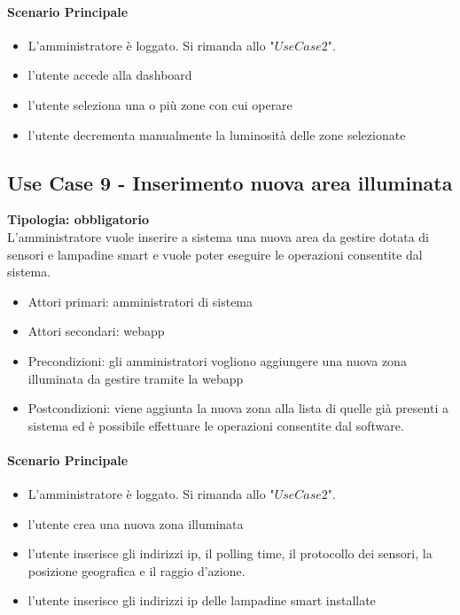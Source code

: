 \documentclass[12pt]{article}
\begin{document}
\paragraph{Scenario Principale}
\begin{itemize}
	\item L'amministratore è loggato. Si rimanda allo "$Use Case 2$".
	\item l'utente accede alla dashboard
	\item l'utente seleziona una o più zone con cui operare
	\item l'utente decrementa manualmente la luminosità delle zone selezionate
\end{itemize}

\subsection{Use Case 9 - Inserimento nuova area illuminata}
\textbf{Tipologia: obbligatorio} \\
L'amministratore vuole inserire a sistema una nuova area da gestire dotata di sensori e lampadine smart e vuole poter eseguire le operazioni consentite dal sistema.
\begin{itemize}
	\item Attori primari: amministratori di sistema
	\item Attori secondari: webapp
	\item Precondizioni: gli amministratori vogliono aggiungere una nuova zona illuminata da gestire tramite la webapp
	\item Postcondizioni: viene aggiunta la nuova zona alla lista di quelle già presenti a sistema ed è possibile effettuare le operazioni consentite dal software.
\end{itemize}
\paragraph{Scenario Principale}
\begin{itemize}
	\item L'amministratore è loggato. Si rimanda allo "$Use Case 2$".
	\item l'utente crea una nuova zona illuminata
	\item l'utente inserisce gli indirizzi ip, il polling time, il protocollo dei sensori, la posizione geografica e il raggio d'azione.
	\item l'utente inserisce gli indirizzi ip delle lampadine smart installate
\end{itemize}
\end{document}
